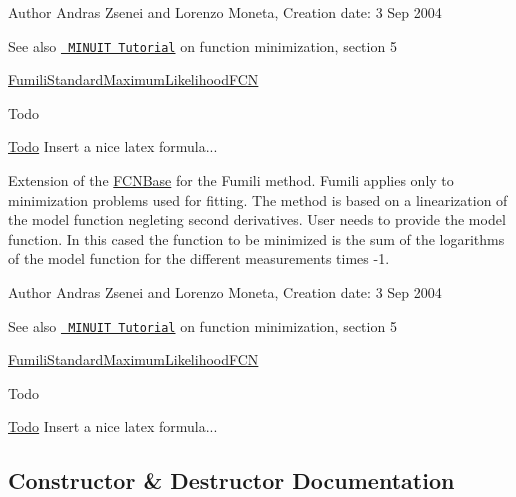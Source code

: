 \begin{DoxyAuthor}{Author}
Andras Zsenei and Lorenzo Moneta, Creation date\+: 3 Sep 2004
\end{DoxyAuthor}
\begin{DoxySeeAlso}{See also}
\href{http://www.cern.ch/winkler/minuit/tutorial/mntutorial.pdf}{\texttt{ M\+I\+N\+U\+IT Tutorial}} on function minimization, section 5

\mbox{\hyperlink{classROOT_1_1Minuit2_1_1FumiliStandardMaximumLikelihoodFCN}{Fumili\+Standard\+Maximum\+Likelihood\+F\+CN}}
\end{DoxySeeAlso}
\begin{DoxyRefDesc}{Todo}
\item[\mbox{\hyperlink{todo__todo000008}{Todo}}]Insert a nice latex formula...\end{DoxyRefDesc}


Extension of the \mbox{\hyperlink{classROOT_1_1Minuit2_1_1FCNBase}{F\+C\+N\+Base}} for the Fumili method. Fumili applies only to minimization problems used for fitting. The method is based on a linearization of the model function negleting second derivatives. User needs to provide the model function. In this cased the function to be minimized is the sum of the logarithms of the model function for the different measurements times -\/1.

\begin{DoxyAuthor}{Author}
Andras Zsenei and Lorenzo Moneta, Creation date\+: 3 Sep 2004
\end{DoxyAuthor}
\begin{DoxySeeAlso}{See also}
\href{http://www.cern.ch/winkler/minuit/tutorial/mntutorial.pdf}{\texttt{ M\+I\+N\+U\+IT Tutorial}} on function minimization, section 5

\mbox{\hyperlink{classROOT_1_1Minuit2_1_1FumiliStandardMaximumLikelihoodFCN}{Fumili\+Standard\+Maximum\+Likelihood\+F\+CN}}
\end{DoxySeeAlso}
\begin{DoxyRefDesc}{Todo}
\item[\mbox{\hyperlink{todo__todo000020}{Todo}}]Insert a nice latex formula...\end{DoxyRefDesc}


\subsection{Constructor \& Destructor Documentation}
\mbox{\label{classROOT_1_1Minuit2_1_1FumiliMaximumLikelihoodFCN_ad62f29a2682f961ea769c2596a799abb}} 
